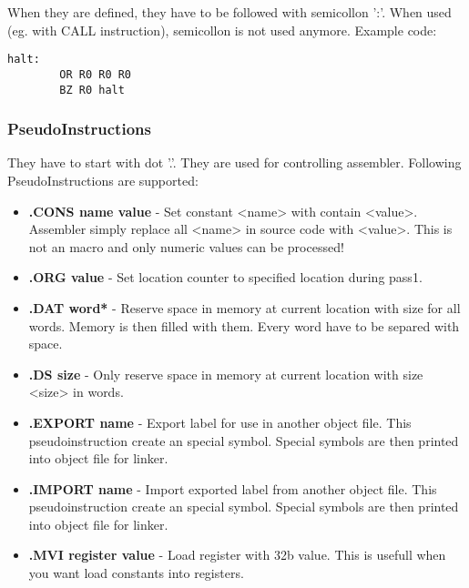 When they are defined, they have to be followed with semicollon ':'. When used
(eg. with CALL instruction), semicollon is not used anymore. Example code:

\begin{lstlisting}[language={[x86masm]Assembler}, frame=single]
    halt:
        OR R0 R0 R0
        BZ R0 halt
\end{lstlisting}

\subsubsection{PseudoInstructions}

They have to start with dot '.'. They are used for controlling assembler. Following
PseudoInstructions are supported:

\begin{itemize}
    \item \textbf{.CONS name value} -
    Set constant <name> with contain <value>. Assembler simply replace all
    <name> in source code with <value>. This is not an macro and only numeric
    values can be processed!

    \item \textbf{.ORG value} -
    Set location counter to specified location during pass1.

    \item \textbf{.DAT word*} -
    Reserve space in memory at current location with size for all words.
    Memory is then filled with them. Every word have to be separed with
    space.

    \item \textbf{.DS size} -
    Only reserve space in memory at current location with size <size> in words.

    \item \textbf{.EXPORT name} -
    Export label for use in another object file. This pseudoinstruction create
    an special symbol. Special symbols are then printed into object file for
    linker.

    \item \textbf{.IMPORT name} -
    Import exported label from another object file. This pseudoinstruction
    create an special symbol. Special symbols are then printed into object file
    for linker.

    \item \textbf{.MVI register value} -
    Load register with 32b value. This is usefull when you want load constants
    into registers.
\end{itemize}
